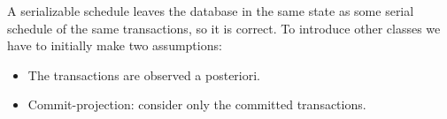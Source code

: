 A serializable schedule leaves the database in the same state as some serial schedule of the same transactions, so it is correct. To introduce other classes we have to initially
make two assumptions: 
\begin{itemize}
    \item The transactions are observed a posteriori. 
    \item Commit-projection: consider only the committed transactions. 
\end{itemize}